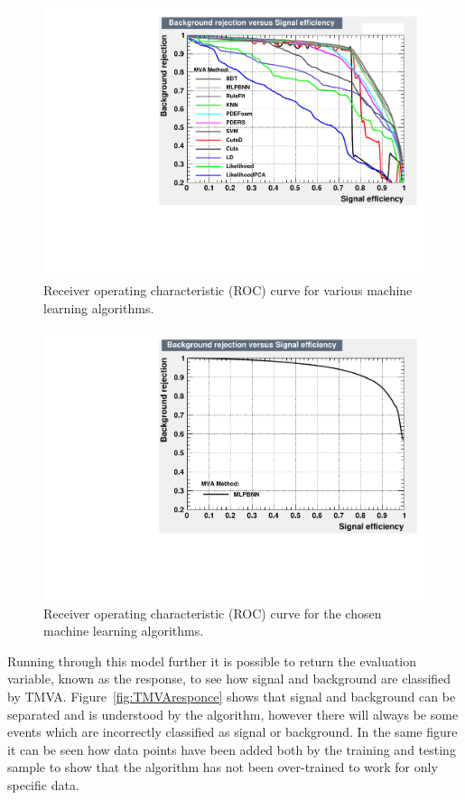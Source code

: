 \begin{figure}[h!]
\centering

\includegraphics[width=\textwidth]{figures/TMVA/roc12.pdf}
\caption{Receiver operating characteristic (ROC) curve for various machine learning algorithms.}
\label{fig:TMVAroc}
\end{figure}

\begin{figure}[h!]
\centering

\includegraphics[width=\textwidth]{figures/TMVA/ROC1.pdf}
\caption{Receiver operating characteristic (ROC) curve for the chosen machine learning algorithms.}
\label{fig:TMVAroc2}
\end{figure}

Running through this model further it is possible to return the evaluation variable, known as the response, to see how signal and background are classified by TMVA. Figure~\ref{fig:TMVAresponce} shows that signal and background can be separated and is understood by the algorithm, however there will always be some events which are incorrectly classified as signal or background. In the same figure it can be seen how data points have been added both by the training and testing sample to show that the algorithm has not been over-trained to work for only specific data.

